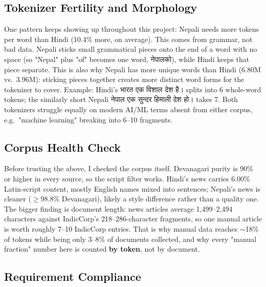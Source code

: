\documentclass[11pt]{article}
\newcommand{\dn}[1]{{\devanagarifont #1}}
\begin{document}
\subsection{Tokenizer Fertility and Morphology}

One pattern keeps showing up throughout this project: Nepali needs more tokens per word than Hindi (10.4\% more, on average). This comes from grammar, not bad data. Nepali sticks small grammatical pieces onto the end of a word with no space (so "Nepal" plus "of" becomes one word, \dn{नेपालको}), while Hindi keeps that piece separate. This is also why Nepali has more unique words than Hindi (6.80M vs.\ 3.96M): sticking pieces together creates more distinct word forms for the tokenizer to cover. Example: Hindi's \dn{भारत एक विशाल देश है।} splits into 6 whole-word tokens; the similarly short Nepali \dn{नेपाल एक सुन्दर हिमाली देश हो।} takes 7. Both tokenizers struggle equally on modern AI/ML terms absent from either corpus, e.g.\ "machine learning" breaking into 6--10 fragments.

\subsection{Corpus Health Check}
\label{sec:corpus-health}

Before trusting the above, I checked the corpus itself. Devanagari purity is 90\% or higher in every source, so the script filter works. Hindi's news carries 6.00\% Latin-script content, mostly English names mixed into sentences; Nepali's news is cleaner ($\geq$98.8\% Devanagari), likely a style difference rather than a quality one. The bigger finding is document length: news articles average 1,499--2,494 characters against IndicCorp's 218--286-character fragments, so one manual article is worth roughly 7--10 IndicCorp entries. That is why manual data reaches $\sim$18\% of tokens while being only 3--8\% of documents collected, and why every "manual fraction" number here is counted \textbf{by token}, not by document.

\subsection{Requirement Compliance}
\end{document}
